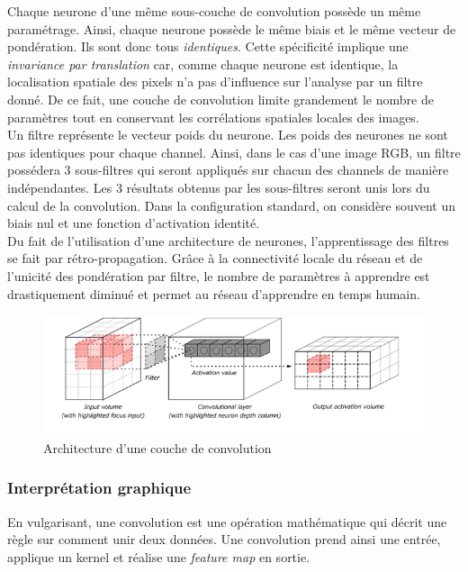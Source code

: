 \noindent Chaque neurone d'une même sous-couche de convolution possède un même paramétrage. Ainsi, chaque neurone possède le même biais et le même vecteur de pondération. Ils sont donc tous \textit{identiques}. Cette spécificité implique une \textit{invariance par translation} car, comme chaque neurone est identique, la localisation spatiale des pixels n'a pas d'influence sur l'analyse par un filtre donné. De ce fait, une couche de convolution limite grandement le nombre de paramètres tout en conservant les corrélations spatiales locales des images.\\

\noindent Un filtre représente le vecteur poids du neurone. Les poids des neurones ne sont pas identiques pour chaque channel. Ainsi, dans le cas d'une image RGB, un filtre possédera 3 sous-filtres qui seront appliqués sur chacun des channels de manière indépendantes. Les 3 résultats obtenus par les sous-filtres seront unis lors du calcul de la convolution. Dans la configuration standard, on considère souvent un biais nul et une fonction d'activation identité.\\

\noindent Du fait de l'utilisation d'une architecture de neurones, l'apprentissage des filtres se fait par rétro-propagation. Grâce à la connectivité locale du réseau et de l'unicité des pondération par filtre, le nombre de paramètres à apprendre est drastiquement diminué et permet au réseau d'apprendre en temps humain.

\begin{figure}
    \centering
    \includegraphics[scale=0.4]{./tex/convolution-network/cnn/conv_fig.png}
    \caption{Architecture d'une couche de convolution}
    \label{conv_pic}
\end{figure}

\subsubsection{Interprétation graphique}
En vulgarisant, une convolution est une opération mathématique qui décrit une règle sur comment unir deux données. Une convolution prend ainsi une entrée, applique un kernel et réalise une \textit{feature map} en sortie.\\

